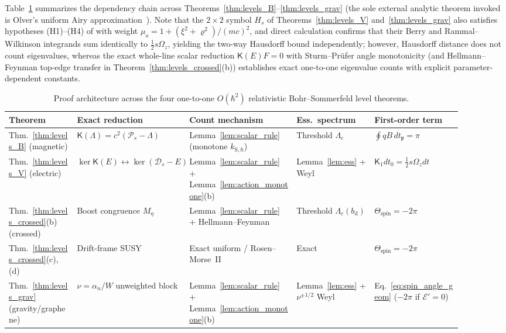 \documentclass[aps,prd,onecolumn,tightenlines,nofootinbib,notitlepage,10pt,floatfix]{revtex4-2}
\theoremstyle{indentedtheorem}
\begin{document}
Table~\ref{tab:proofs_use} summarizes the dependency chain across Theorems~\ref{thm:levels_B}--\ref{thm:levels_grav} (the sole external analytic theorem invoked is Olver's uniform Airy approximation~\citep[Ch.~11, Thm.~3.1]{Olver1974Asymptotics}). Note that the $2\times 2$ symbol $H_s$ of Theorems~\ref{thm:levels_V} and~\ref{thm:levels_grav} also satisfies hypotheses (H1)--(H4) of \citet{BeckerFujiieWittsten2025Bohr} with weight $\mu_\text{o}=1+(\xi^2+\varrho^2)/(mc)^2$, and direct calculation confirms that their Berry and Rammal--Wilkinson integrands sum identically to $\tfrac{1}{2}s\Omega_z$, yielding the two-way Hausdorff bound independently; however, Hausdorff distance does not count eigenvalues, whereas the exact whole-line scalar reduction $\mathsf{K}(E)F=0$ with Sturm--Pr\"ufer angle monotonicity (and Hellmann--Feynman top-edge transfer in Theorem~\ref{thm:levels_crossed}(b)) establishes exact one-to-one eigenvalue counts with explicit parameter-dependent constants.

\begin{table}[htbp]
\centering
\footnotesize
\setlength{\tabcolsep}{4pt}
\caption{Proof architecture across the four one-to-one $O(\hbar^2)$ relativistic Bohr--Sommerfeld level theorems.}
\label{tab:proofs_use}
\begin{tabular}{@{}p{0.14\linewidth}p{0.20\linewidth}p{0.22\linewidth}p{0.16\linewidth}p{0.18\linewidth}@{}}
\toprule
\textbf{Theorem} & \textbf{Exact reduction} & \textbf{Count mechanism} & \textbf{Ess.\ spectrum} & \textbf{First-order term} \\
\midrule
Thm.~\ref{thm:levels_B} (magnetic) & $\mathsf{K}(\Lambda)=c^2(\mathcal{P}_s-\Lambda)$ & Lemma~\ref{lem:scalar_rule} (monotone $k_{\text{S},\hbar}$) & Threshold $\Lambda_c$ & $\oint qB\,dt_\mathfrak{p}=\pi$ \\
Thm.~\ref{thm:levels_V} (electric) & $\ker\mathsf{K}(E)\leftrightarrow\ker(\mathcal{D}_s-E)$ & Lemma~\ref{lem:scalar_rule} + Lemma~\ref{lem:action_monotone}(b) & Lemma~\ref{lem:ess} + Weyl & $\mathsf{K}_1 dt_0=\tfrac{1}{2}s\Omega_z dt$ \\
Thm.~\ref{thm:levels_crossed}(b) (crossed) & Boost congruence $M_\eta$ & Lemma~\ref{lem:scalar_rule} + Hellmann--Feynman & Threshold $\Lambda_c(b_\text{d})$ & $\Theta_\text{spin}=-2\pi$ \\
Thm.~\ref{thm:levels_crossed}(c),(d) & Drift-frame SUSY & Exact uniform / Rosen--Morse~II & Exact & $\Theta_\text{spin}=-2\pi$ \\
Thm.~\ref{thm:levels_grav} (gravity/graphene) & $\nu=\alpha_n/W$ unweighted block & Lemma~\ref{lem:scalar_rule} + Lemma~\ref{lem:action_monotone}(b) & Lemma~\ref{lem:ess} + $\nu^{\pm 1/2}$ Weyl & Eq.~\eqref{eq:spin_angle_geom} ($-2\pi$ if $\mathcal{E}'=0$) \\
\bottomrule
\end{tabular}
\end{table}
\end{document}
